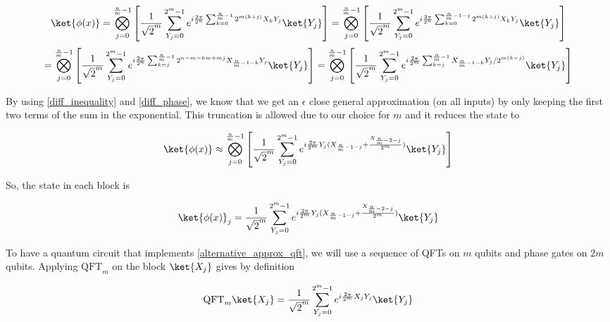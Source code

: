 \begin{equation*}
    \ket{\phi(x)} = \bigotimes_{j=0}^{\frac{n}{m}-1} \left[\frac{1}{\sqrt{2}^m}\sum_{Y_j=0}^{2^m-1}e^{i\frac{2\pi}{2^n}\sum_{k=0}^{\frac{n}{m}-1}2^{m(k+j)}X_kY_j}\ket{Y_j}\right] = \bigotimes_{j=0}^{\frac{n}{m}-1} \left[\frac{1}{\sqrt{2}^m}\sum_{Y_j=0}^{2^m-1}e^{i\frac{2\pi}{2^n}\sum_{k=0}^{\frac{n}{m}-1-j}2^{m(k+j)}X_kY_j}\ket{Y_j}\right]
\end{equation*}
\begin{equation*}
    = \bigotimes_{j=0}^{\frac{n}{m}-1} \left[\frac{1}{\sqrt{2}^m}\sum_{Y_j=0}^{2^m-1}e^{i\frac{2\pi}{2^n}\sum_{k=j}^{\frac{n}{m}-1}2^{n-m-km+mj}X_{\frac{n}{m}-1-k}Y_j}\ket{Y_j}\right] = \bigotimes_{j=0}^{\frac{n}{m}-1} \left[\frac{1}{\sqrt{2}^m}\sum_{Y_j=0}^{2^m-1}e^{i\frac{2\pi}{2^m}\sum_{k=j}^{\frac{n}{m}-1}X_{\frac{n}{m}-1-k}Y_j/2^{m(k-j)}}\ket{Y_j}\right] 
\end{equation*}

By using \ref{diff_inequality} and \ref{diff_phase}, we know that we get an $\epsilon$ close general approximation (on all inputs) by only keeping the first two terms of the sum in the exponential. This truncation is allowed due to our choice for $m$ and it reduces the state to

\begin{equation}
    \ket{\phi(x)} \approx \bigotimes_{j=0}^{\frac{n}{m}-1} \left[\frac{1}{\sqrt{2}^m}\sum_{Y_j=0}^{2^m-1}e^{i\frac{2\pi}{2^m}Y_j(X_{\frac{n}{m}-1-j} + \frac{X_{\frac{n}{m}-2-j}}{2^m})}\ket{Y_j}\right]
    \label{alternative_approx_qft}
\end{equation}

So, the state in each block is 

\begin{equation}
    \ket{\phi(x)}_j = \frac{1}{\sqrt{2}^m}\sum_{Y_j=0}^{2^m-1}e^{i\frac{2\pi}{2^m}Y_j(X_{\frac{n}{m}-1-j} + \frac{X_{\frac{n}{m}-2-j}}{2^m})}\ket{Y_j}
    \label{alternative_approx_qft_block}
\end{equation}

To have a quantum circuit that implements \ref{alternative_approx_qft}, we will use a sequence of QFTs on $m$ qubits and phase gates on $2m$ qubits. Applying $\text{QFT}_m$ on the block $\ket{X_{j}}$ gives by definition 

\begin{equation*}
    \text{QFT}_m\ket{X_{j}} = \frac{1}{\sqrt{2}^m}\sum_{Y_{j}=0}^{2^m-1}e^{i\frac{2\pi}{2^m}X_{j}Y_{j}}\ket{Y_{j}}
\end{equation*}

